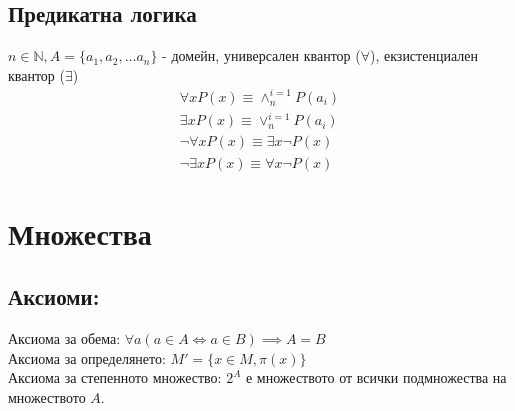 \documentclass[12pt]{article}
\begin{document}
    \subsection*{Предикатна логика}
    \( n \in \mathbb{N}, A = \{ a_1, a_2, \dots a_n \} \) - домейн, универсален квантор (\( \forall \)), екзистенциален квантор (\( \exists \)) \\
    \begin{gather*}
        \forall x P(x) \equiv \land^{i=1}_{n} P(a_i) \\
        \exists x P(x) \equiv \lor^{i=1}_{n} P(a_i) \\
        \neg \forall x P(x) \equiv \exists x \neg P(x) \\
        \neg \exists x P(x) \equiv \forall x \neg P(x)
    \end{gather*}
    \section{Множества}
    \subsection*{Аксиоми:}
    Аксиома за обема: $ \forall a (a \in A \iff a \in B) \implies A=B $ \\
    Аксиома за определянето: $ M'=\{ x \in M, \pi (x) \} $ \\
    Аксиома за степенното множество: $ 2^A $ е множеството от всички подмножества на множеството $A$.
    
\end{document}
